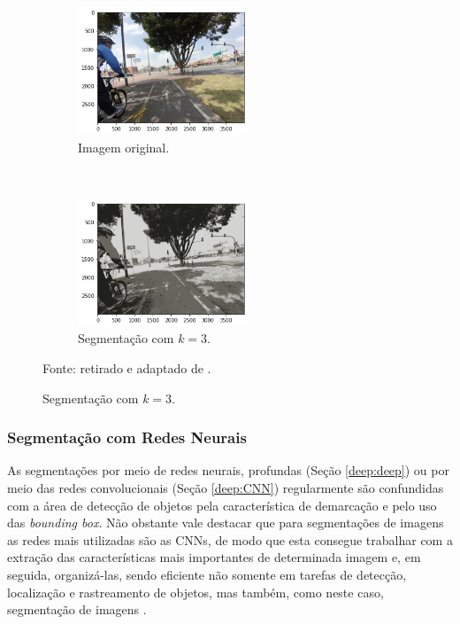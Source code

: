 \begin{figure}[H]
   \caption{Segmentação com K-means.}
   \centering
   \label{segment:fig:5}
    \begin{subfigure}[t]{0.45\textwidth}
        \centering
        \includegraphics[height=1.5in]{recursos/imagens/image_seg/i1.png}
        \caption{Imagem original.}
        \label{segment:fig:5.1}
    \end{subfigure}%
    ~ 
    \begin{subfigure}[t]{0.45\textwidth}
        \centering
        \includegraphics[height=1.5in]{recursos/imagens/image_seg/i2.png}
        \caption{Segmentação com $k = 3$.}
        \label{segment:fig:5.2}
    \end{subfigure}%

    \vspace*{1 cm}
    Fonte: retirado e adaptado de \cite{Neuhold2017_ICCV}.
\end{figure}

\subsubsection{Segmentação com Redes Neurais}
\label{segment:neural}

As segmentações por meio de redes neurais, profundas (Seção \ref{deep:deep}) ou por meio das redes convolucionais (Seção \ref{deep:CNN}) regularmente são confundidas com a área de detecção de objetos \cite{Ghosh2019} pela característica de demarcação e pelo uso das \textit{bounding box}. Não obstante vale destacar que para segmentações de imagens as redes mais utilizadas são as CNNs, de modo que esta consegue trabalhar com a extração das características mais importantes de determinada imagem e, em seguida, organizá-las, sendo eficiente não somente em tarefas de detecção, localização e rastreamento de objetos, mas também, como neste caso, segmentação de imagens \cite{Ghosh2019}.

